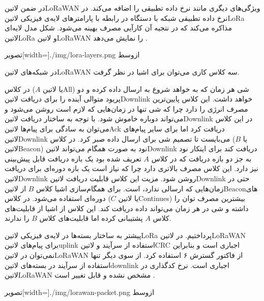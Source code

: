 در ضمن ‌لاتین{LoRaWAN} ویژگی‌های دیگری مانند نرخ داده تطبیقی را اضافه می‌کند. در نرخ داده تطبیقی شبکه با دستگاه در رابطه با پارامترهای لایه‌ی فیزیکی ‌لاتین{LoRa} مذاکره می‌کند
که در نتجیه آن کارآیی مصرف بهینه می‌شود. شکل  مدل لایه‌ای ‌لاتین{LoRa} و ‌لاتین{LoRaWAN} را نمایش می‌دهد
.

‌تصویر[width=\textwidth]{./img/lora-layers.png}
‌ازوسط

در شبکه‌های ‌لاتین{LoRaWAN} سه کلاس کاری می‌توان برای اشیا در نظر گرفت.

 در کلاس ($A$ یا ‌لاتین{All}) شی هر زمان که به خواهد شروع به ارسال داده کرده و دو پریود متوالی آینده را برای دریافت ‌لاتین{Downlink} خواهد داشت. این کلاس پایین‌ترین مصرف انرژی را دارد چرا که شی تنها در زمان‌هایی که لازم است
روشن می‌شود و می‌تواند دوباره خاموش شود. با توجه به ساختار دریافت ‌لاتین{Downlink} در این کلاس می‌توان به سادگی برای پیام‌ها ‌لاتین{Ack} دریافت کرد اما برای سایر پیام‌های ‌لاتین{Downlink} می‌بایست تا تصمیم شی برای ارسال داده صبر کرد.
 در کلاس ($B$ یا ‌لاتین{Beacon}) نود به صورت همگام می‌تواند ‌لاتین{Downlink} دریافت کند برای اینکار نود به جز دو بازه دریافت که در کلاس $A$ تعریف شده بود یک بازه دریافت قابل پیش‌بینی نیز دارد.
این کلاس مصرف بالاتری دارد چرا که نیاز است یک بازه دوره‌ای برای دریافت ‌لاتین{Downlink} روشن شود. مزیت این کلاس قابلیت دریافت ‌لاتین{Downlink} حتی در زمان‌هایی که ارسالی ندارد، است. برای همگام‌سازی اشیا کلاس $B$ از ‌لاتین{Beacon}های دوره‌ای استفاده می‌شود.
 در کلاس ($C$ یا ‌لاتین{Continues}) بیشترین مصرف توان را داشته و شی در هر زمان می‌تواند داده دریافت کند. این کلاس از اشیا از قابلیت‌های کلاس $A$ پشتیبانی کرده اما قابلیت‌های کلاس $B$ را ندارند.

پیشتر به ساختار بسته‌ها در لایه‌ی فیزیکی ‌لاتین{LoRa} پرداختیم. در ‌لاتین{LoRaWAN} برای پیام‌های ‌لاتین{uplink} استفاده از سرآیند و ‌لاتین{CRC} اجباری است
و بنابراین نمی‌توان در ‌لاتین{LoRaWAN} از فاکتور گسترش ۶ استفاده کرد. از سوی دیگر تنها استفاده از سرآیند در بسته‌های ‌لاتین{downlink} اجباری است.
نرخ کدگذاری در ‌لاتین{LoRaWAN} مشخص نشده و قابل تغییر است
.

‌تصویر[width=\textwidth]{./img/lorawan-packet.png}
‌ازوسط

